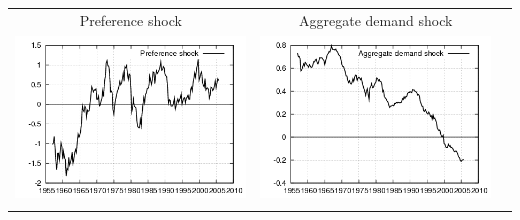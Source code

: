\documentclass{beamer}
\begin{document}
{\begin{center}
\begin{tabular}{ccc}
  \small{Preference shock} & \small{Aggregate demand shock} & \\
  \includegraphics[scale=0.23]{plots2/cap_initest_prefsh.png} & \includegraphics[scale=0.23]{plots2/cap_initre_ADsh.png} & \\ \\
  \end{tabular}
  \end{center}
}
\end{document}
